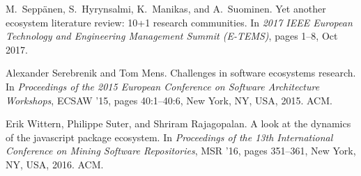 \documentclass[10pt,conference]{IEEEtran}
\begin{document}
\begin{thebibliography}{00}
  M.~{Seppänen}, S.~{Hyrynsalmi}, K.~{Manikas}, and A.~{Suominen}.
  \newblock Yet another ecosystem literature review: 10+1 research communities.
  \newblock In {\em 2017 IEEE European Technology and Engineering Management
    Summit (E-TEMS)}, pages 1--8, Oct 2017.
  
  Alexander Serebrenik and Tom Mens.
  \newblock Challenges in software ecosystems research.
  \newblock In {\em Proceedings of the 2015 European Conference on Software
    Architecture Workshops}, ECSAW '15, pages 40:1--40:6, New York, NY, USA,
    2015. ACM.
  
  Erik Wittern, Philippe Suter, and Shriram Rajagopalan.
  \newblock A look at the dynamics of the javascript package ecosystem.
  \newblock In {\em Proceedings of the 13th International Conference on Mining
    Software Repositories}, MSR '16, pages 351--361, New York, NY, USA, 2016.
    ACM.
  
  \end{thebibliography}
  
\vspace{12pt}
\end{document}
